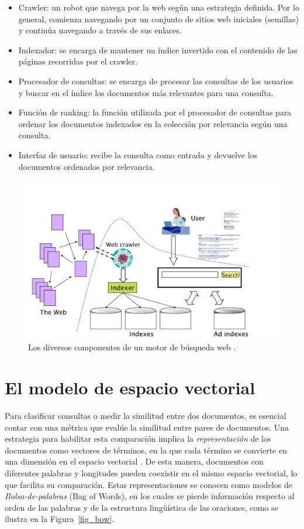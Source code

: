 \begin{itemize}
\item Crawler: un robot que navega por la web según una estrategia definida. Por lo general, comienza navegando por un conjunto de sitios web iniciales (semillas) y continúa navegando a través de sus enlaces.
\item Indexador: se encarga de mantener un índice invertido con el contenido de las páginas recorridas por el crawler.
\item Procesador de consultas: se encarga de procesar las consultas de los usuarios y buscar en el índice los documentos más relevantes para una consulta.
\item Función de ranking: la función utilizada por el procesador de consultas para ordenar los documentos indexados en la colección por relevancia según una consulta.
\item Interfaz de usuario: recibe la consulta como entrada y devuelve los documentos ordenados por relevancia.
\end{itemize}


\begin{figure}[h!]
\centering
\includegraphics[scale=0.25]{pics/searchengine.png}
\caption{Los diversos componentes de un motor de búsqueda web \cite{manning2008}.}
\label{fig_buscador}
\end{figure}


\section{El modelo de espacio vectorial}
Para clasificar consultas o medir la similitud entre dos documentos, es esencial contar con una métrica que evalúe la similitud entre pares de documentos. Una estrategia para habilitar esta comparación implica la \textit{representación} de los documentos como vectores de términos, en la que cada término se convierte en una dimensión en el espacio vectorial \cite{salton1975vector}. De esta manera, documentos con diferentes palabras y longitudes pueden coexistir en el mismo espacio vectorial, lo que facilita su comparación. Estas representaciones se conocen como modelos de \emph{Bolsa-de-palabras} (Bag of Words), en los cuales se pierde información respecto al orden de las palabras y de la estructura lingüística de las oraciones, como se ilustra en la Figura~\ref{fig_bow}.



